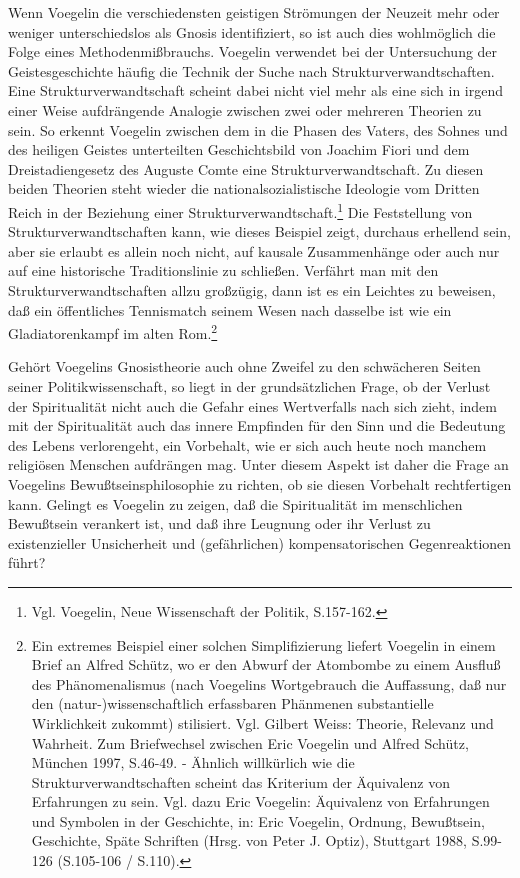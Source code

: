 Wenn Voegelin die verschiedensten geistigen Strömungen der Neuzeit mehr oder
weniger unterschiedslos als Gnosis identifiziert, so ist auch dies wohlmöglich
die Folge eines Methodenmißbrauchs. Voegelin verwendet bei der Untersuchung
der Geistesgeschichte häufig die Technik der Suche nach
Strukturverwandtschaften. Eine Strukturverwandtschaft scheint dabei nicht viel
mehr als eine sich in irgend einer Weise aufdrängende Analogie zwischen zwei
oder mehreren Theorien zu sein. So erkennt Voegelin zwischen dem in die Phasen
des Vaters, des Sohnes und des heiligen Geistes unterteilten Geschichtsbild
von Joachim Fiori und dem Dreistadiengesetz des Auguste Comte eine
Strukturverwandtschaft.  Zu diesen beiden Theorien steht wieder die
nationalsozialistische Ideologie vom Dritten Reich in der Beziehung einer
Strukturverwandtschaft.\footnote{Vgl. Voegelin, Neue Wissenschaft der Politik,
  S.157-162.} Die Feststellung von Strukturverwandtschaften kann, wie dieses
Beispiel zeigt, durchaus erhellend sein, aber sie erlaubt es allein noch
nicht, auf kausale Zusammenhänge oder auch nur auf eine historische
Traditionslinie zu schließen. Verfährt man mit den Strukturverwandtschaften
allzu großzügig, dann ist es ein Leichtes zu beweisen, daß ein öffentliches
Tennismatch seinem Wesen nach dasselbe ist wie ein Gladiatorenkampf im alten
Rom.\footnote{Ein extremes Beispiel einer solchen Simplifizierung liefert
  Voegelin in einem Brief an Alfred Schütz, wo er den Abwurf der Atombombe zu
  einem Ausfluß des Phänomenalismus (nach Voegelins Wortgebrauch die
  Auf\/fassung, daß nur den (natur-)wissenschaftlich erfassbaren Phänmenen
  substantielle Wirklichkeit zukommt) stilisiert.
  Vgl. Gilbert Weiss: Theorie, Relevanz und Wahrheit. Zum Briefwechsel
  zwischen Eric Voegelin und Alfred Schütz, München 1997, S.46-49. - Ähnlich
  willkürlich wie die Strukturverwandtschaften scheint das Kriterium der
  Äquivalenz von Erfahrungen zu sein. Vgl. dazu Eric Voegelin: Äquivalenz von
  Erfahrungen und Symbolen in der Geschichte, in: Eric Voegelin, Ordnung,
  Bewußtsein, Geschichte, Späte Schriften (Hrsg. von Peter J. Optiz),
  Stuttgart 1988, S.99-126 (S.105-106 / S.110).}

Gehört Voegelins Gnosistheorie auch ohne Zweifel zu den schwächeren Seiten
seiner Politikwissenschaft, so liegt in der grundsätzlichen Frage, ob der
Verlust der Spiritualität nicht auch die Gefahr eines Wertverfalls nach sich
zieht, indem mit der Spiritualität auch das innere Empfinden für den Sinn und
die Bedeutung des Lebens verlorengeht, ein Vorbehalt, wie er sich auch heute
noch manchem religiösen Menschen aufdrängen mag. Unter diesem Aspekt ist daher
die Frage an Voegelins Bewußtseinsphilosophie zu richten, ob sie diesen
Vorbehalt rechtfertigen kann.  Gelingt es Voegelin zu zeigen, daß die
Spiritualität im menschlichen Bewußtsein verankert ist, und daß ihre Leugnung
oder ihr Verlust zu existenzieller Unsicherheit und (gefährlichen)
kompensatorischen Gegenreaktionen führt?

